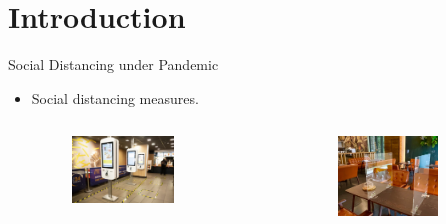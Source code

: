 
\section{Introduction}
\frame{\sectionpage}

\begin{frame}{Social Distancing under Pandemic}
  \begin{itemize}
    \item Social distancing measures.
    \begin{columns}[c]  %
      \column{6cm}  %
      \begin{figure}[ht]
        \centering
        \includegraphics[width = 0.7\textwidth]{./images/McDonald.png}
      \end{figure}
      \column{4cm}
      \scriptsize
      \begin{figure}[ht]
        \centering
        \includegraphics[width=0.9\textwidth,height=0.7\textwidth]{./images/res2.jpg}
      \end{figure}
      \end{columns} 


\end{itemize}
\end{frame}
